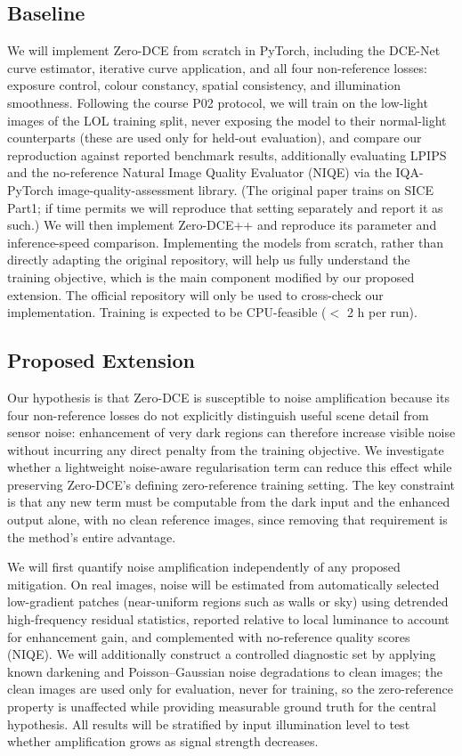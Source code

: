 \documentclass[11pt, letterpaper]{article}
\begin{document}
\subsection{Baseline}

We will implement Zero-DCE from scratch in PyTorch, including the DCE-Net curve estimator, iterative curve application, and all four non-reference losses: exposure control, colour constancy, spatial consistency, and illumination smoothness. Following the course P02 protocol, we will train on the low-light images of the LOL training split, never exposing the model to their normal-light counterparts (these are used only for held-out evaluation), and compare our reproduction against reported benchmark results, additionally evaluating LPIPS and the no-reference Natural Image Quality Evaluator (NIQE) via the IQA-PyTorch image-quality-assessment library. (The original paper trains on SICE Part1; if time permits we will reproduce that setting separately and report it as such.) We will then implement Zero-DCE++ and reproduce its parameter and inference-speed comparison. Implementing the models from scratch, rather than directly adapting the original repository, will help us fully understand the training objective, which is the main component modified by our proposed extension. The official repository will only be used to cross-check our implementation. Training is expected to be CPU-feasible ($<$ 2 h per run).

\subsection{Proposed Extension}

Our hypothesis is that Zero-DCE is susceptible to noise amplification because its four non-reference losses do not explicitly distinguish useful scene detail from sensor noise: enhancement of very dark regions can therefore increase visible noise without incurring any direct penalty from the training objective. We investigate whether a lightweight noise-aware regularisation term can reduce this effect while preserving Zero-DCE's defining zero-reference training setting. The key constraint is that any new term must be computable from the dark input and the enhanced output alone, with no clean reference images, since removing that requirement is the method's entire advantage.

We will first quantify noise amplification independently of any proposed mitigation. On real images, noise will be estimated from automatically selected low-gradient patches (near-uniform regions such as walls or sky) using detrended high-frequency residual statistics, reported relative to local luminance to account for enhancement gain, and complemented with no-reference quality scores (NIQE). We will additionally construct a controlled diagnostic set by applying known darkening and Poisson--Gaussian noise degradations to clean images; the clean images are used only for evaluation, never for training, so the zero-reference property is unaffected while providing measurable ground truth for the central hypothesis. All results will be stratified by input illumination level to test whether amplification grows as signal strength decreases.
\end{document}
